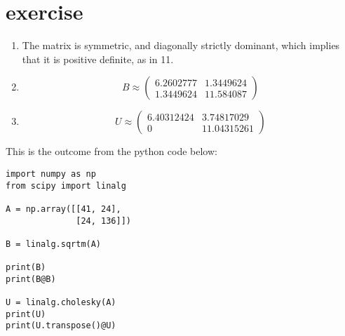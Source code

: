 \documentclass{article}
\begin{document}
\section{exercise}
\begin{enumerate}
    \item The matrix is symmetric, and diagonally strictly dominant,
          which implies that it is positive definite, as in 11.
    \item \[
              B \approx \begin{pmatrix}
                  6.2602777 & 1.3449624 \\
                  1.3449624 & 11.584087
              \end{pmatrix}
          \]
    \item \[
              U \approx \begin{pmatrix}
                  6.40312424 & 3.74817029  \\
                  0          & 11.04315261
              \end{pmatrix}
          \]
\end{enumerate}
This is the outcome from the python code below:
\begin{lstlisting}
import numpy as np
from scipy import linalg

A = np.array([[41, 24],
              [24, 136]])

B = linalg.sqrtm(A)

print(B)
print(B@B)

U = linalg.cholesky(A)
print(U)
print(U.transpose()@U)
\end{lstlisting}
\end{document}
